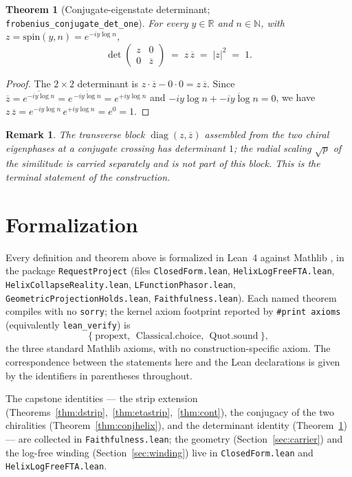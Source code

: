 \documentclass[11pt]{article}
\newtheorem{theorem}[definition]{Theorem}
\newtheorem{remark}[definition]{Remark}
\DeclareMathOperator{\diag}{diag}
\newcommand{\R}{\mathbb{R}}
\newcommand{\N}{\mathbb{N}}
\newcommand{\conj}[1]{\overline{#1}}
\newcommand{\code}[1]{\texttt{#1}}
\begin{document}
\begin{theorem}[Conjugate-eigenstate determinant; \code{frobenius\_conjugate\_det\_one}]\label{thm:det}
For every $y\in\R$ and $n\in\N$, with $z=\mathrm{spin}(y,n)=e^{-iy\log n}$,
\[
  \det
  \begin{pmatrix} z & 0\\[2pt] 0 & \conj z \end{pmatrix}
  \;=\; z\,\conj z \;=\; |z|^2 \;=\; 1 .
\]
\end{theorem}

\begin{proof}
The $2\times2$ determinant is $z\cdot\conj z-0\cdot0=z\,\conj z$. Since $\conj z=\conj{e^{-iy\log n}}
=e^{\,\conj{-iy\log n}}=e^{+iy\log n}$ and $-iy\log n+\overline{-iy\log n}=0$, we have
$z\,\conj z=e^{-iy\log n}\,e^{+iy\log n}=e^{0}=1$.
\end{proof}

\begin{remark}\label{rem:end}
The transverse block $\diag(z,\conj z)$ assembled from the two chiral eigenphases at a conjugate
crossing has determinant $1$; the radial scaling $\sqrt p$ of the similitude is carried separately
and is not part of this block. This is the terminal statement of the construction.
\end{remark}

\section{Formalization}\label{sec:formal}

Every definition and theorem above is formalized in Lean~4 \cite{Lean4} against Mathlib
\cite{Mathlib2020}, in the package
\code{RequestProject} (files \code{ClosedForm.lean}, \code{HelixLogFreeFTA.lean},
\code{HelixCollapseReality.lean}, \code{LFunctionPhasor.lean}, \code{GeometricProjectionHolds.lean},
\code{Faithfulness.lean}). Each named
theorem compiles with no \code{sorry}; the kernel axiom footprint reported by \code{\#print axioms}
(equivalently \code{lean\_verify}) is
\[
  \{\ \mathrm{propext},\ \ \mathrm{Classical.choice},\ \ \mathrm{Quot.sound}\ \},
\]
the three standard Mathlib axioms, with no construction-specific axiom. The correspondence between
the statements here and the Lean declarations is given by the identifiers in parentheses throughout.

The capstone identities --- the strip extension (Theorems~\ref{thm:dstrip},~\ref{thm:etastrip},~\ref{thm:cont}),
the conjugacy of the two chiralities (Theorem~\ref{thm:conjhelix}), and the determinant identity
(Theorem~\ref{thm:det}) --- are collected in \code{Faithfulness.lean}; the geometry
(Section~\ref{sec:carrier}) and the log-free winding (Section~\ref{sec:winding}) live in
\code{ClosedForm.lean} and \code{HelixLogFreeFTA.lean}.
\end{document}
